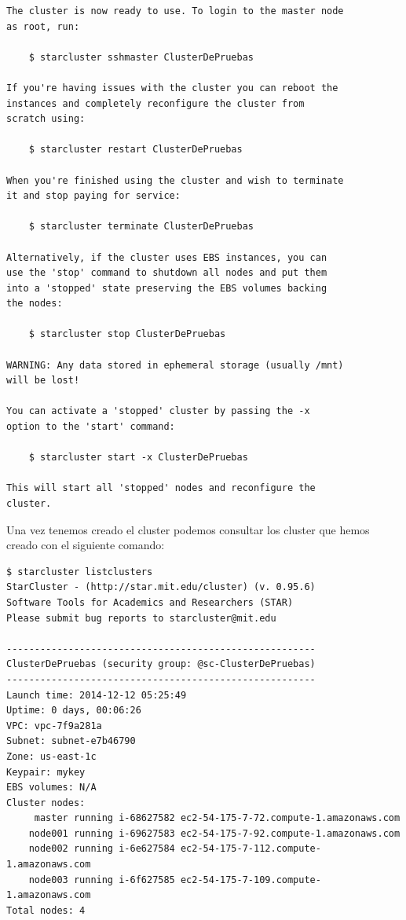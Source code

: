 \documentclass{article}
\begin{document}
\begin{lstlisting}[style=miniBash]
The cluster is now ready to use. To login to the master node
as root, run:

    $ starcluster sshmaster ClusterDePruebas

If you're having issues with the cluster you can reboot the
instances and completely reconfigure the cluster from
scratch using:

    $ starcluster restart ClusterDePruebas

When you're finished using the cluster and wish to terminate
it and stop paying for service:

    $ starcluster terminate ClusterDePruebas

Alternatively, if the cluster uses EBS instances, you can
use the 'stop' command to shutdown all nodes and put them
into a 'stopped' state preserving the EBS volumes backing
the nodes:

    $ starcluster stop ClusterDePruebas

WARNING: Any data stored in ephemeral storage (usually /mnt)
will be lost!

You can activate a 'stopped' cluster by passing the -x
option to the 'start' command:

    $ starcluster start -x ClusterDePruebas

This will start all 'stopped' nodes and reconfigure the
cluster.
\end{lstlisting}

	Una vez tenemos creado el cluster podemos consultar los cluster que hemos creado con el siguiente comando:
\begin{lstlisting}[style=miniBash]
$ starcluster listclusters
StarCluster - (http://star.mit.edu/cluster) (v. 0.95.6)
Software Tools for Academics and Researchers (STAR)
Please submit bug reports to starcluster@mit.edu

-------------------------------------------------------
ClusterDePruebas (security group: @sc-ClusterDePruebas)
-------------------------------------------------------
Launch time: 2014-12-12 05:25:49
Uptime: 0 days, 00:06:26
VPC: vpc-7f9a281a
Subnet: subnet-e7b46790
Zone: us-east-1c
Keypair: mykey
EBS volumes: N/A
Cluster nodes:
     master running i-68627582 ec2-54-175-7-72.compute-1.amazonaws.com
    node001 running i-69627583 ec2-54-175-7-92.compute-1.amazonaws.com
    node002 running i-6e627584 ec2-54-175-7-112.compute-1.amazonaws.com
    node003 running i-6f627585 ec2-54-175-7-109.compute-1.amazonaws.com
Total nodes: 4
\end{lstlisting}
\end{document}
